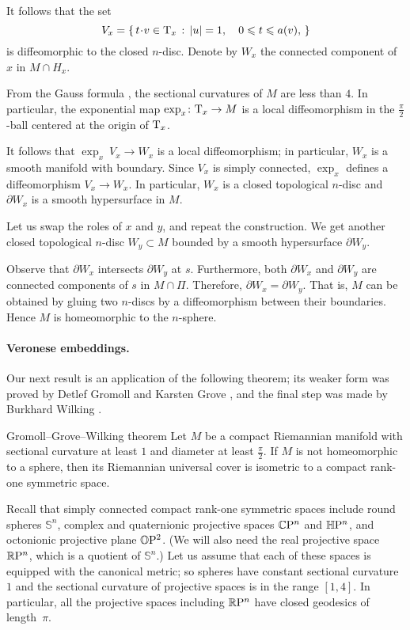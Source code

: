 \documentclass[a4paper,10pt]{article}
\begin{document}
It follows that the set 
\[V_x=\set{t\cdot v\in \T_x}{|u|=1,\quad 0\le t\le a(v),}\]
is diffeomorphic to the closed $n$-disc.
Denote by $W_x$ the connected component of $x$ in $M\cap H_x$.

From the Gauss formula \cite[Lemma 5]{petrunin2024}, the sectional curvatures of $M$ are less than $4$.
In particular, the exponential map $\exp_x\colon\mathrm{T}_x\to M$ is a local diffeomorphism in the $\tfrac\pi2$-ball centered at the origin of $\mathrm{T}_x$.

It follows that $\exp_x\:V_x\to W_x$ is a local diffeomorphism;
in particular, $W_x$ is a smooth manifold with boundary.
Since $V_x$ is simply connected, $\exp_x$ defines a diffeomorphism $V_x\to W_x$.
In particular, $W_x$ is a closed topological $n$-disc and $\partial W_x$ is a smooth hypersurface in $M$.

Let us swap the roles of $x$ and $y$, and repeat the construction.
We get another closed topological $n$-disc $W_y\subset M$ bounded by a smooth hypersurface $\partial W_y$.

Observe that $\partial W_x$ intersects $\partial W_y$ at $s$.
Furthermore, both $\partial W_x$ and $\partial W_y$ are connected components of $s$ in $M\cap \Pi$.
Therefore, $\partial W_x=\partial W_y$.
That is, $M$ can be obtained by gluing two $n$-discs by a diffeomorphism between their boundaries.
Hence $M$ is homeomorphic to the $n$-sphere.
\qeds

\paragraph{Veronese embeddings.}\label{thm:=}
Our next result is an application of the following theorem;
its weaker form was proved by Detlef Gromoll and Karsten Grove \cite{gromoll-grove}, and
the final step was made by Burkhard Wilking \cite{wilking}.

\begin{thm}{Gromoll--Grove--Wilking theorem}\label{thm:GGW}
Let $M$ be a compact Riemannian manifold with sectional curvature at least $1$ and
diameter at least $\tfrac\pi2$.
If $M$ is not homeomorphic to a sphere, then its Riemannian universal cover is isometric to a compact rank-one symmetric space.
\end{thm}

Recall that simply connected compact rank-one symmetric spaces include round spheres $\mathbb{S}^n$, complex and quaternionic projective spaces $\mathbb{C}\mathrm{P}^n$ and $\mathbb{H}\mathrm{P}^n$, and octonionic projective plane $\mathbb{O}\mathrm{P}^2$.
(We will also need the real projective space $\mathbb{R}\mathrm{P}^n$, which is a quotient of $\mathbb{S}^n$.)
Let us assume that each of these spaces is equipped with the canonical metric;
so spheres have constant sectional curvature $1$ and the sectional curvature of projective spaces is in the range $[1,4]$.
In particular, all the projective spaces including $\mathbb{R}\mathrm{P}^n$ have closed geodesics of length~$\pi$.
\end{document}

